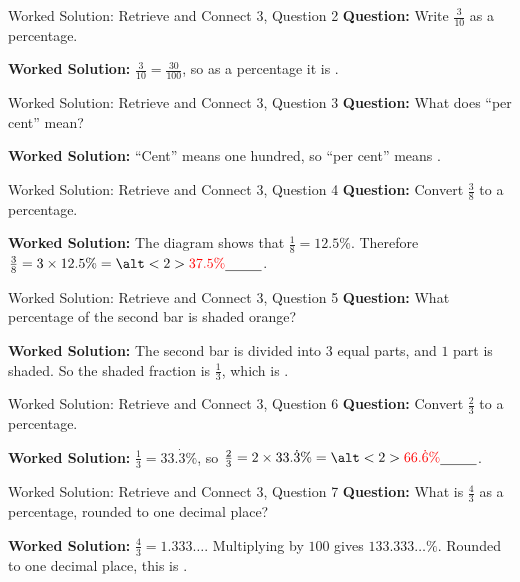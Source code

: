 \documentclass{beamer}
\newcommand{\ablank}[1]{%
  \alt<2>{\textcolor{red}{#1}}{\underline{\phantom{#1}}}%
}
\begin{document}
\begin{frame}[t]{Worked Solution: Retrieve and Connect 3, Question 2}
\textbf{Question:} Write \(\frac{3}{10}\) as a percentage.

\smallskip
\textbf{Worked Solution:} \(\frac{3}{10} = \frac{30}{100}\), so as a percentage it is \ablank{$30\%$}.
\end{frame}

\begin{frame}[t]{Worked Solution: Retrieve and Connect 3, Question 3}
\textbf{Question:} What does ``per cent'' mean?

\smallskip
\textbf{Worked Solution:} ``Cent'' means one hundred, so ``per cent'' means \ablank{out of 100}.
\end{frame}

\begin{frame}[t]{Worked Solution: Retrieve and Connect 3, Question 4}
\textbf{Question:} Convert \(\frac{3}{8}\) to a percentage.

\smallskip
\textbf{Worked Solution:} The diagram shows that \(\frac{1}{8} = 12.5\%\). Therefore \(\frac{3}{8} = 3 \times 12.5\% = \ablank{37.5\%}\).
\end{frame}

\begin{frame}[t]{Worked Solution: Retrieve and Connect 3, Question 5}
\textbf{Question:} What percentage of the second bar is shaded orange?

\smallskip
\textbf{Worked Solution:} The second bar is divided into \(3\) equal parts, and \(1\) part is shaded. So the shaded fraction is \(\frac{1}{3}\), which is \ablank{$33.\dot{3}\%$}.
\end{frame}

\begin{frame}[t]{Worked Solution: Retrieve and Connect 3, Question 6}
\textbf{Question:} Convert \(\frac{2}{3}\) to a percentage.

\smallskip
\textbf{Worked Solution:} \(\frac{1}{3} = 33.\dot{3}\%\), so \(\frac{2}{3} = 2 \times 33.\dot{3}\% = \ablank{66.\dot{6}\%}\).
\end{frame}

\begin{frame}[t]{Worked Solution: Retrieve and Connect 3, Question 7}
\textbf{Question:} What is \(\frac{4}{3}\) as a percentage, rounded to one decimal place?

\smallskip
\textbf{Worked Solution:} \(\frac{4}{3} = 1.333\ldots\). Multiplying by \(100\) gives \(133.333\ldots\%\). Rounded to one decimal place, this is \ablank{$133.3\%$}.
\end{frame}
\end{document}
